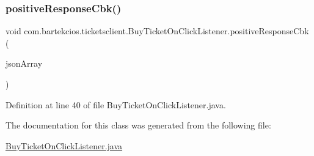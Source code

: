 \subsubsection{\texorpdfstring{positive\+Response\+Cbk()}{positiveResponseCbk()}}
{\footnotesize\ttfamily void com.\+bartekcios.\+ticketsclient.\+Buy\+Ticket\+On\+Click\+Listener.\+positive\+Response\+Cbk (\begin{DoxyParamCaption}\item[{J\+S\+O\+N\+Array}]{json\+Array }\end{DoxyParamCaption})}



Definition at line 40 of file Buy\+Ticket\+On\+Click\+Listener.\+java.



The documentation for this class was generated from the following file\+:\begin{DoxyCompactItemize}
\item 
\hyperlink{_buy_ticket_on_click_listener_8java}{Buy\+Ticket\+On\+Click\+Listener.\+java}\end{DoxyCompactItemize}
